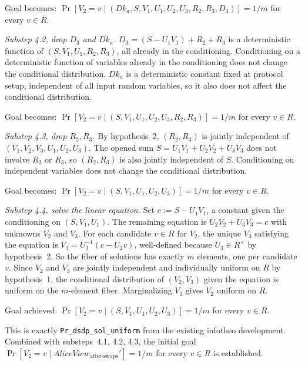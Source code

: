\documentclass[11pt]{article}
\newcommand{\AliceViewHyb}{\mathit{AliceView}_{\textrm{after-swaps}}'}
\newcommand{\Dk}{\mathit{Dk}}
\begin{document}
\quad Goal becomes: $\Pr[V_2 = v \mid (\Dk_a, S, V_1, U_1, U_2, U_3, R_2, R_3, D_3)] = 1/m$ for every $v \in R$.

\medskip

\textit{Substep 4.2, drop $D_3$ and $\Dk_a$.} $D_3 = (S - U_1 V_1) + R_2 + R_3$ is a deterministic function of $(S, V_1, U_1, R_2, R_3)$, all already in the conditioning. Conditioning on a deterministic function of variables already in the conditioning does not change the conditional distribution. $\Dk_a$ is a deterministic constant fixed at protocol setup, independent of all input random variables, so it also does not affect the conditional distribution.

\quad Goal becomes: $\Pr[V_2 = v \mid (S, V_1, U_1, U_2, U_3, R_2, R_3)] = 1/m$ for every $v \in R$.

\medskip

\textit{Substep 4.3, drop $R_2, R_3$.} By hypothesis~2, $(R_2, R_3)$ is jointly independent of $(V_1, V_2, V_3, U_1, U_2, U_3)$. The opened sum $S = U_1 V_1 + U_2 V_2 + U_3 V_3$ does not involve $R_2$ or $R_3$, so $(R_2, R_3)$ is also jointly independent of $S$. Conditioning on independent variables does not change the conditional distribution.

\quad Goal becomes: $\Pr[V_2 = v \mid (S, V_1, U_1, U_2, U_3)] = 1/m$ for every $v \in R$.

\medskip

\textit{Substep 4.4, solve the linear equation.} Set $c := S - U_1 V_1$, a constant given the conditioning on $(S, V_1, U_1)$. The remaining equation is $U_2 V_2 + U_3 V_3 = c$ with unknowns $V_2$ and $V_3$. For each candidate $v \in R$ for $V_2$, the unique $V_3$ satisfying the equation is $V_3 = U_3^{-1}(c - U_2 v)$, well-defined because $U_3 \in R^\times$ by hypothesis~2. So the fiber of solutions has exactly $m$ elements, one per candidate $v$. Since $V_2$ and $V_3$ are jointly independent and individually uniform on $R$ by hypothesis~1, the conditional distribution of $(V_2, V_3)$ given the equation is uniform on the $m$-element fiber. Marginalizing $V_3$ gives $V_2$ uniform on $R$.

\quad Goal achieved: $\Pr[V_2 = v \mid (S, V_1, U_1, U_2, U_3)] = 1/m$ for every $v \in R$.

This is exactly \texttt{Pr\_dsdp\_sol\_uniform} from the existing infotheo development. Combined with substeps~4.1, 4.2, 4.3, the initial goal $\Pr[V_2 = v \mid \AliceViewHyb] = 1/m$ for every $v \in R$ is established.
\end{document}
